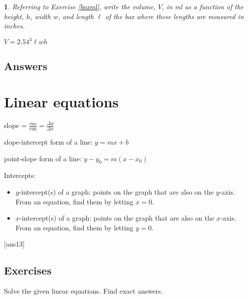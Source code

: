 \documentclass{amsbook}
\newtheorem{exc}{}
\newenvironment{ex}{\begin{exc}\normalfont}{\end{exc}}
\numberwithin{section}{chapter}
\numberwithin{equation}{chapter}
\newcommand{\ds}{\displaystyle}
\begin{document}
\begin{ex}
	Referring to Exercise \ref{boxml}, write the volume, $V$, in ml as a function of the height, $h$, width $w$, and length $\ell$ of the box where these lengths are measured in inches.
	\begin{sol}
		$V = 2.54^3\ell w h$
		\end{sol}
\end{ex}


\subsection*{Answers \nopunct} \hfill
\begin{multicols}{2}
	
\end{multicols}


\newpage
\section{Linear equations} \label{lineq}

slope = $\ds{\frac{\text{rise}}{\text{run}} = \frac{\Delta y}{\Delta x}}$

slope-intercept form of a line: $y=mx+b$

point-slope form of a line: $y-y_0 = m(x-x_0)$

Intercepts:
\begin{itemize}
	\item $y$-intercept(s) of a graph: points on the graph that are also on the $y$-axis. From an equation, find them by letting $x=0$.
	\item $x$-intercept(s) of a graph: points on the graph that are also on the $x$-axis. From an equation, find them by letting $y=0$.
\end{itemize}

[ans13]
\subsection*{Exercises \nopunct} \hfill

Solve the given linear equations. Find exact answers.
\end{document}
